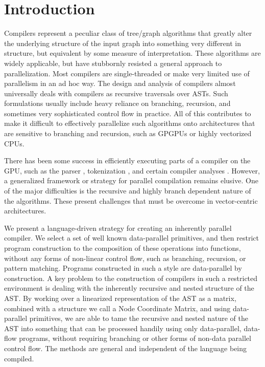 \documentclass[numbers,9pt]{sigplanconf}
\begin{document}
\section{Introduction}

Compilers represent a peculiar class of tree/graph algorithms that greatly 
alter the underlying structure of the input graph into something very 
different in structure, but equivalent by some measure of interpretation. 
These algorithms are widely applicable, but have stubbornly resisted a 
general approach to parallelization. Most compilers are single-threaded 
or make very limited use of parallelism in an ad hoc way. The design and 
analysis of compilers almost universally deals with compilers as recursive 
traversals over ASTs. Such formulations usually include heavy reliance on 
branching, recursion, and sometimes very sophisticated control flow in 
practice. All of this contributes to make it difficult to effectively 
parallelize such algorithms onto architectures that are sensitive to 
branching and recursion, such as GPGPUs or highly vectorized CPUs. 

There has been some success in efficiently executing parts of a compiler 
on the GPU, such as the parser \cite{bunda1984apl}, 
tokenization \cite{bernecky2003tokenizer}, and certain compiler 
analyses \cite{prabhu2011eigencfa,mendez2012inclusion}. However, a generalized 
framework or strategy for parallel compilation remains elusive. One of 
the major difficulties is the recursive and highly branch dependent nature 
of the algorithms. These present challenges that must be overcome in 
vector-centric architectures. 

We present a language-driven strategy for creating an inherently parallel 
compiler. We select a set of well known data-parallel primitives, and then 
restrict program construction to the composition of these operations into 
functions, without any forms of non-linear control flow, such as branching, 
recursion, or pattern matching. Programs constructed in such a style are 
data-parallel by construction. A key problem to the construction of compilers 
in such a restricted environment is dealing with the inherently recursive and 
nested structure of the AST. By working over a linearized representation of 
the AST as a matrix, combined with a structure we call a Node Coordinate 
Matrix, and using data-parallel primitives, we are able to tame the recursive 
and nested nature of the AST into something that can be processed handily 
using only data-parallel, data-flow programs, without requiring branching 
or other forms of non-data parallel control flow. 
The methods are general and independent of the language being compiled.
\end{document}
